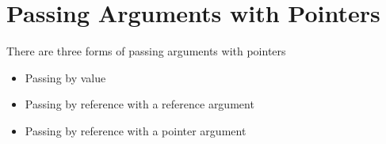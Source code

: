 \section{Passing Arguments with Pointers}
\label{sec:Passing Arguments with Pointers}
There are three forms of passing arguments with pointers
\begin{itemize}
    \item Passing by value
    \item Passing by reference with a reference argument
    \item Passing by reference with a pointer argument
\end{itemize}